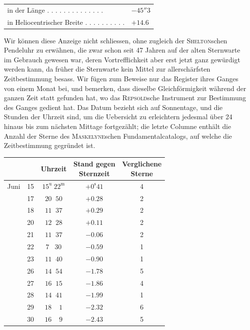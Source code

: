 \begin{center}
\begin{tabular}{ll}
in der Länge . . . . . . . . . . . . . . & $-45''3$ \\
in Heliocentrischer Breite . . . . . . . . . . & $+14.6$ \\
\end{tabular}
\end{center}

\par\indent Wir können diese Anzeige nicht schliessen, ohne zugleich der \textsc{Shelton}schen Pendeluhr zu erwähnen, die zwar schon seit 47 Jahren auf der alten Sternwarte im Gebrauch gewesen war, deren Vortrefflichkeit aber erst jetzt ganz gewürdigt werden kann, da früher die Sternwarte kein Mittel zur allerschärfsten Zeitbestimmung besass. Wir fügen zum Beweise nur das Register ihres Ganges von einem Monat bei, und bemerken, dass dieselbe Gleichförmigkeit während der ganzen Zeit statt gefunden hat, wo das \textsc{Repsold}sche Instrument zur Bestimmung des Ganges gedient hat. Das Datum bezieht sich auf Sonnentage, und die Stunden der Uhrzeit sind, um die Uebersicht zu erleichtern jedesmal über 24 hinaus bis zum nächsten Mittage fortgezählt; die letzte Columne enthält die Anzahl der Sterne des \textsc{Maskelyne}schen Fundamentalcatalogs, auf welche die Zeitbestimmung gegründet ist.

\begin{center}
\begin{tabular}{ll|c|c|c}
 & & Uhrzeit & \shortstack{Stand gegen\\Sternzeit} & \shortstack{Verglichene\\Sterne} \\
\hline
Juni & 15 & $15^{\mathrm u}\;22^{\mathrm m}$ & $+0^{\mathrm s}41$ & 4 \\
 & 17 & $20\;\;50$ & $+0.28$ & 2 \\
 & 18 & $11\;\;37$ & $+0.29$ & 2 \\
 & 20 & $12\;\;28$ & $+0.11$ & 2 \\
 & 21 & $11\;\;37$ & $-0.06$ & 2 \\
 & 22 & $7\;\;\;30$ & $-0.59$ & 1 \\
 & 23 & $11\;\;40$ & $-0.90$ & 1 \\
 & 26 & $14\;\;54$ & $-1.78$ & 5 \\
 & 27 & $16\;\;15$ & $-1.86$ & 4 \\
 & 28 & $14\;\;41$ & $-1.99$ & 1 \\
 & 29 & $18\;\;\;\;1$ & $-2.32$ & 6 \\
 & 30 & $16\;\;\;\;9$ & $-2.43$ & 5 \\
\end{tabular}
\end{center}

